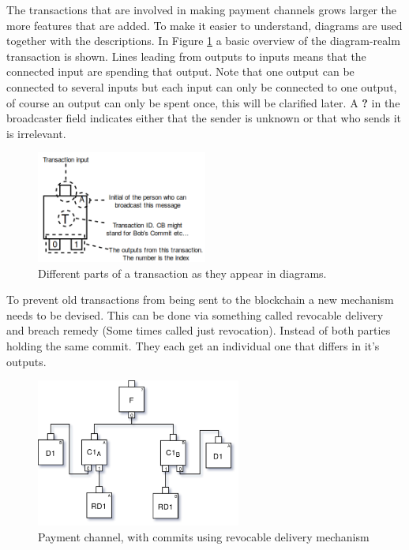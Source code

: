 The transactions that are involved in making payment channels grows larger the more features that are added. To make it easier to understand, diagrams are used together with the descriptions. In Figure \ref{fig:anatomy} a basic overview of the diagram-realm transaction is shown. Lines leading from outputs to inputs means that the connected input are spending that output. Note that one output can be connected to several inputs but each input can only be connected to one output, of course an output can only be spent once, this will be clarified later. A \textbf{?} in the broadcaster field indicates either that the sender is unknown or that who sends it is irrelevant. 


\begin{figure}[H]
	\centering
	\includegraphics[width=0.5\textwidth]{background/images/tx_anatomy.png}
	\caption{Different parts of a transaction as they appear in diagrams.}
	\label{fig:anatomy}
\end{figure}

To prevent old transactions from being sent to the blockchain a new mechanism needs to be devised. This can be done via something called revocable delivery and breach remedy (Some times called just revocation).
Instead of both parties holding the same commit. They each get an individual one that differs in it's outputs. 

\begin{figure}[H]
	\centering
	\includegraphics[width=0.6\textwidth]{background/images/payment_channel_pre_breach.png}
	\caption{Payment channel, with commits using revocable delivery mechanism}
	\label{fig:pre-breach}
\end{figure}

